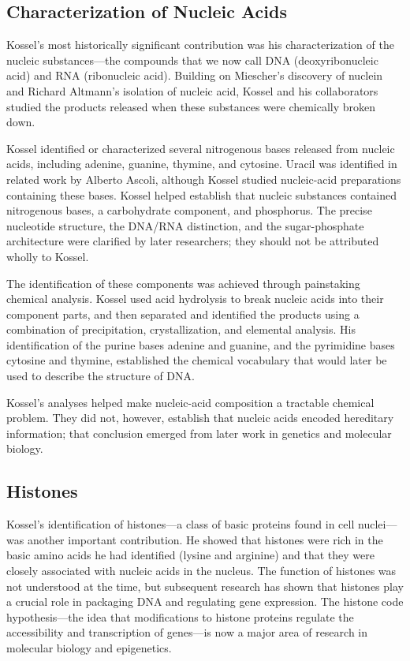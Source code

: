 \subsection{Characterization of Nucleic Acids}

Kossel's most historically significant contribution was his characterization of the nucleic substances---the compounds that we now call DNA (deoxyribonucleic acid) and RNA (ribonucleic acid). Building on Miescher's discovery of nuclein and Richard Altmann's isolation of nucleic acid, Kossel and his collaborators studied the products released when these substances were chemically broken down.\cite{kossel-history}

Kossel identified or characterized several nitrogenous bases released from nucleic acids, including adenine, guanine, thymine, and cytosine. Uracil was identified in related work by Alberto Ascoli, although Kossel studied nucleic-acid preparations containing these bases. Kossel helped establish that nucleic substances contained nitrogenous bases, a carbohydrate component, and phosphorus. The precise nucleotide structure, the DNA/RNA distinction, and the sugar-phosphate architecture were clarified by later researchers; they should not be attributed wholly to Kossel.\cite{lecture-1910,kossel-history}

The identification of these components was achieved through painstaking chemical analysis. Kossel used acid hydrolysis to break nucleic acids into their component parts, and then separated and identified the products using a combination of precipitation, crystallization, and elemental analysis. His identification of the purine bases adenine and guanine, and the pyrimidine bases cytosine and thymine, established the chemical vocabulary that would later be used to describe the structure of DNA.\cite{lecture-1910,kossel-history}

Kossel's analyses helped make nucleic-acid composition a tractable chemical problem. They did not, however, establish that nucleic acids encoded hereditary information; that conclusion emerged from later work in genetics and molecular biology.

\subsection{Histones}

Kossel's identification of histones---a class of basic proteins found in cell nuclei---was another important contribution. He showed that histones were rich in the basic amino acids he had identified (lysine and arginine) and that they were closely associated with nucleic acids in the nucleus. The function of histones was not understood at the time, but subsequent research has shown that histones play a crucial role in packaging DNA and regulating gene expression. The histone code hypothesis---the idea that modifications to histone proteins regulate the accessibility and transcription of genes---is now a major area of research in molecular biology and epigenetics.

